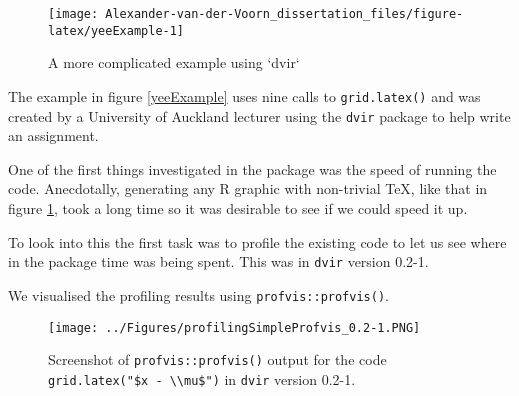 \documentclass[]{article}
\newenvironment{Shaded}{\begin{snugshade}}{\end{snugshade}}
\newcommand{\KeywordTok}[1]{\textcolor[rgb]{0.13,0.29,0.53}{\textbf{#1}}}
\newcommand{\DataTypeTok}[1]{\textcolor[rgb]{0.13,0.29,0.53}{#1}}
\newcommand{\FloatTok}[1]{\textcolor[rgb]{0.00,0.00,0.81}{#1}}
\newcommand{\CharTok}[1]{\textcolor[rgb]{0.31,0.60,0.02}{#1}}
\newcommand{\StringTok}[1]{\textcolor[rgb]{0.31,0.60,0.02}{#1}}
\newcommand{\NormalTok}[1]{#1}
\begin{document}
\begin{Shaded}
\end{Shaded}

\begin{figure}

{\centering \texttt{[image: Alexander-van-der-Voorn\_dissertation\_files/figure-latex/yeeExample-1]} 

}

\caption{A more complicated example using `dvir`}\label{fig:yeeExample}
\end{figure}

The example in figure \ref{yeeExample} uses nine calls to
\texttt{grid.latex()} and was created by a University of Auckland
lecturer using the \texttt{dvir} package to help write an assignment.

One of the first things investigated in the package was the speed of
running the code. Anecdotally, generating any R graphic with non-trivial
\TeX{}, like that in figure \ref{fig:yeeExample}, took a long time so it
was desirable to see if we could speed it up.

To look into this the first task was to profile the existing code to let
us see where in the package time was being spent. This was in
\texttt{dvir} version 0.2-1.

We visualised the profiling results using \texttt{profvis::profvis()}.

\begin{figure}
\centering
\texttt{[image: ../Figures/profilingSimpleProfvis\_0.2-1.PNG]}
\caption{Screenshot of \texttt{profvis::profvis()} output for the code
\texttt{grid.latex("\$x\ -\ \textbackslash{}\textbackslash{}mu\$")} in
\texttt{dvir} version 0.2-1.}
\end{figure}
\end{document}
